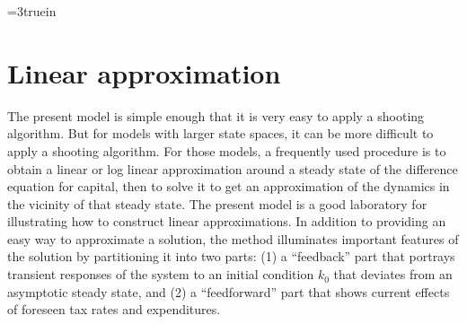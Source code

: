 \centerline{\epsfxsize=3truein}
\caption{Response to foreseen one-time pulse increase in $g$ at $t=10$. From
left to right, top to bottom: $k, c, \bar R, \eta, g$.}
\endfigure
%


\section{Linear approximation}\label{sec:linapproximation}%
   The present model is simple enough that it is very easy
to apply a shooting algorithm. But for models with  larger state
spaces, it can be more difficult to apply a shooting algorithm. For those
models, a frequently used procedure is to obtain a linear or
log linear approximation
around a steady state of the difference equation for capital, then to solve it to get an approximation of
the dynamics in the vicinity of that steady state. The present model
is a good laboratory for illustrating how to construct linear approximations.
 In addition to providing an easy way to
approximate a solution, the method illuminates important features
of the solution by partitioning it into two parts: (1) a ``feedback'' part that portrays  transient
responses of the system to an initial condition $k_0$ that deviates
from an  asymptotic steady state, and (2) a ``feedforward'' part
that shows  current effects of foreseen
tax rates and expenditures.

